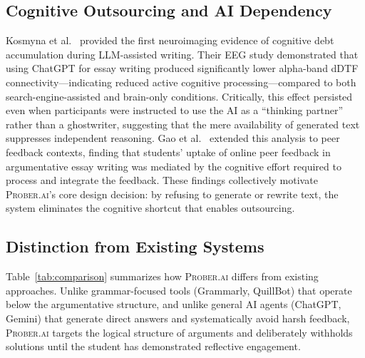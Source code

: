 \documentclass[11pt,a4paper]{article}
\begin{document}
\subsection{Cognitive Outsourcing and AI Dependency}

Kosmyna et al.~\cite{kosmyna2025brain} provided the first neuroimaging evidence of cognitive debt accumulation during LLM-assisted writing. Their EEG study demonstrated that using ChatGPT for essay writing produced significantly lower alpha-band dDTF connectivity---indicating reduced active cognitive processing---compared to both search-engine-assisted and brain-only conditions. Critically, this effect persisted even when participants were instructed to use the AI as a ``thinking partner'' rather than a ghostwriter, suggesting that the mere availability of generated text suppresses independent reasoning. Gao et al.~\cite{gao2024students} extended this analysis to peer feedback contexts, finding that students' uptake of online peer feedback in argumentative essay writing was mediated by the cognitive effort required to process and integrate the feedback. These findings collectively motivate \textsc{Prober.ai}'s core design decision: by refusing to generate or rewrite text, the system eliminates the cognitive shortcut that enables outsourcing.

\subsection{Distinction from Existing Systems}

Table~\ref{tab:comparison} summarizes how \textsc{Prober.ai} differs from existing approaches. Unlike grammar-focused tools (Grammarly, QuillBot) that operate below the argumentative structure, and unlike general AI agents (ChatGPT, Gemini) that generate direct answers and systematically avoid harsh feedback, \textsc{Prober.ai} targets the logical structure of arguments and deliberately withholds solutions until the student has demonstrated reflective engagement.
\end{document}
